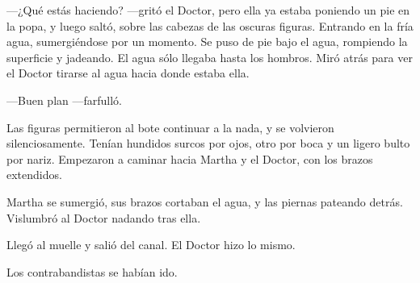 ---¿Qué estás haciendo? ---gritó el Doctor, pero ella ya estaba poniendo un pie en la popa, y luego saltó, sobre las cabezas de las oscuras figuras. Entrando en la fría agua, sumergiéndose por un momento. Se puso de pie bajo el agua, rompiendo la superficie y jadeando. El agua sólo llegaba hasta los hombros. Miró atrás para ver el Doctor tirarse al agua hacia donde estaba ella.

---Buen plan ---farfulló.

Las figuras permitieron al bote continuar a la nada, y se volvieron silenciosamente. Tenían hundidos surcos por ojos, otro por boca y un ligero bulto por nariz. Empezaron a caminar hacia Martha y el Doctor, con los brazos extendidos.

Martha se sumergió, sus brazos cortaban el agua, y las piernas pateando detrás. Vislumbró al Doctor nadando tras ella.

Llegó al muelle y salió del canal. El Doctor hizo lo mismo.

Los contrabandistas se habían ido.

